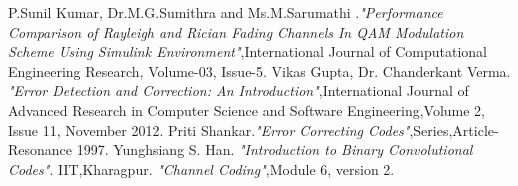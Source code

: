\documentclass[14pt]{report}
\begin{document}
{\begin{thebibliography}{50}
P.Sunil Kumar, Dr.M.G.Sumithra and Ms.M.Sarumathi .\textsl{"Performance Comparison of Rayleigh and Rician Fading Channels In QAM Modulation Scheme Using Simulink Environment"},International Journal of Computational Engineering Research, Volume-03, Issue-5.
 Vikas Gupta, Dr. Chanderkant Verma.   \textsl{"Error Detection and Correction: An Introduction"},International Journal of Advanced Research in Computer Science and Software Engineering,Volume 2, Issue 11, November 2012.
 Priti Shankar.\textsl{"Error Correcting Codes"},Series,Article-Resonance 1997.
 Yunghsiang S. Han. \textsl{"Introduction to Binary Convolutional Codes"}.
IIT,Kharagpur. \textsl{"Channel Coding"},Module 6, version 2.
\end{thebibliography}
}
\end{document}
